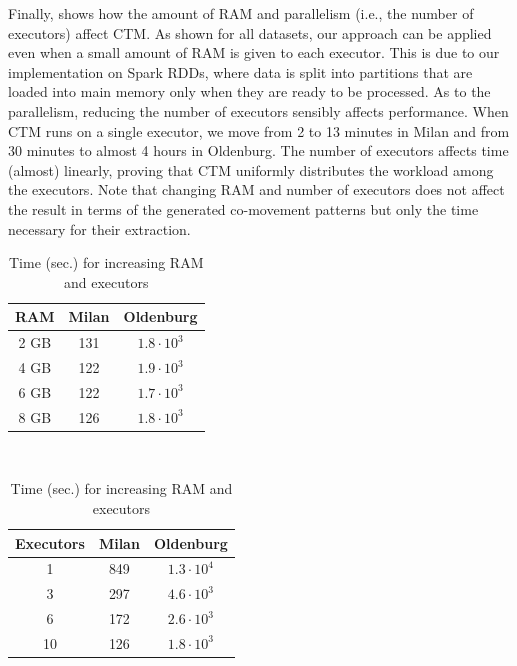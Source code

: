 \documentclass[
]{ceurart}
\renewcommand{\sf}[1]{\textsf{\textup{#1}}}
\begin{document}
Finally,  shows how the amount of RAM and parallelism (i.e., the number of executors) affect CTM.
As shown for all datasets, our approach can be applied even when a small amount of RAM is given to each executor.
This is due to our implementation on Spark RDDs, where data is split into partitions that are loaded into main memory only when they are ready to be processed.
As to the parallelism, reducing the number of executors sensibly affects performance.
When CTM runs on a single executor, we move from 2 to 13 minutes in \sf{Milan} and from 30 minutes to almost 4 hours in \sf{Oldenburg}.
The number of executors affects time (almost) linearly, proving that CTM uniformly distributes the workload among the executors.
Note that changing RAM and number of executors does not affect the result in terms of the generated co-movement patterns but only the time necessary for their extraction.

\begin{table}[t]
\scriptsize\centering
\caption{Time (sec.) for increasing RAM and executors}
\label{tab:efframexec}%

\begin{tabular}{ccc}
\toprule
RAM &  \sf{Milan} &  \sf{Oldenburg} \\%
\midrule
2 GB & 131 & $1.8\cdot10^{3}$ \\%
4 GB & 122 & $1.9\cdot10^{3}$ \\%
6 GB & 122 & $1.7\cdot10^{3}$ \\%
8 GB & 126 & $1.8\cdot10^{3}$ \\%
\bottomrule
\end{tabular}
~
\begin{tabular}{ccc}
\toprule
Executors & \sf{Milan} & \sf{Oldenburg} \\%
\midrule
1  & 849 & $1.3\cdot10^{4}$ \\%
3  & 297 & $4.6\cdot10^{3}$ \\%
6  & 172 & $2.6\cdot10^{3}$ \\%
10 & 126 & $1.8\cdot10^{3}$ \\%
\bottomrule
\end{tabular}
\end{table}%
 
\end{document}
